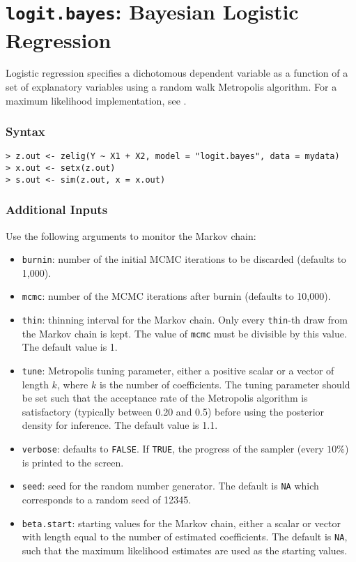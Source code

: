 \section{\texttt{logit.bayes}: Bayesian Logistic Regression}
\label{logit.bayes}

Logistic regression specifies a dichotomous dependent variable as a
function of a set of explanatory variables using a random walk
Metropolis algorithm.  For a maximum likelihood implementation, see
.  

\subsubsection{Syntax}
\begin{verbatim}
> z.out <- zelig(Y ~ X1 + X2, model = "logit.bayes", data = mydata)
> x.out <- setx(z.out)
> s.out <- sim(z.out, x = x.out)
\end{verbatim}

\subsubsection{Additional Inputs}

Use the following arguments to monitor the Markov chain: 
\begin{itemize}
\item \texttt{burnin}: number of the initial MCMC iterations to be 
 discarded (defaults to 1,000). 

\item \texttt{mcmc}: number of the MCMC iterations after burnin
(defaults to 10,000).

\item \texttt{thin}: thinning interval for the Markov chain. Only every 
 \texttt{thin}-th draw from the Markov chain is kept. The value of 
\texttt{mcmc} must be divisible by this value. The default value is 1.

\item \texttt{tune}: Metropolis tuning parameter, either 
a positive scalar or a vector of length $k$, where $k$ is the number
of coefficients. The tuning parameter should be set such that the
acceptance rate of the Metropolis algorithm is satisfactory (typically
between 0.20 and 0.5) before using the posterior density for
inference. The default value is 1.1.

\item \texttt{verbose}: defaults to {\tt FALSE}.  If \texttt{TRUE}, the progress 
 of the sampler (every $10\%$) is printed to the screen.

\item \texttt{seed}: seed for the random number generator.  The
default is \texttt{NA} which corresponds to a random seed of 12345.

\item \texttt{beta.start}: starting values for the Markov 
chain, either a scalar or vector with length equal to the number of
estimated coefficients. The default is \texttt{NA}, such that the maximum
likelihood estimates are used as the starting values.

\end{itemize}

